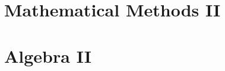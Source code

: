 \documentclass[a4paper]{report}
\begin{document}
\maketitle
\tableofcontents
\setcounter{section}{0}


\chapter{Mathematical Methods II}


\chapter{Algebra II}

\end{document}
